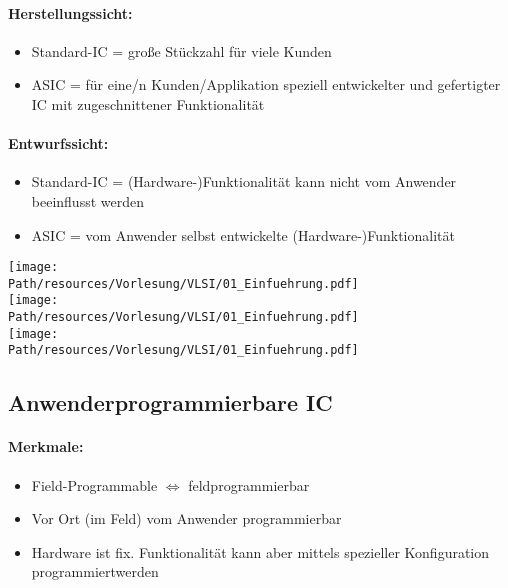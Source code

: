 	\paragraph{Herstellungssicht:}
	\begin{itemize}
		\item Standard-IC = große Stückzahl für viele Kunden
		\item ASIC = für eine/n Kunden/Applikation speziell entwickelter und gefertigter IC mit zugeschnittener Funktionalität
	\end{itemize}

	\paragraph{Entwurfssicht:}
	\begin{itemize}
		\item Standard-IC = (Hardware-)Funktionalität kann nicht vom Anwender beeinflusst werden
		\item ASIC = vom Anwender selbst entwickelte (Hardware-)Funktionalität
	\end{itemize}

	\newpage
	\begin{center}
	\texttt{[image: \\Path/resources/Vorlesung/VLSI/01\_Einfuehrung.pdf]}
	\\\texttt{[image: \\Path/resources/Vorlesung/VLSI/01\_Einfuehrung.pdf]}
	\\\texttt{[image: \\Path/resources/Vorlesung/VLSI/01\_Einfuehrung.pdf]}
	\end{center}

\subsection{Anwenderprogrammierbare IC}
	\paragraph{Merkmale:}
	\begin{itemize}
		\item Field-Programmable $\Leftrightarrow$ feldprogrammierbar
		\item Vor Ort (im Feld) vom Anwender programmierbar
		\item Hardware ist fix. Funktionalität kann aber mittels spezieller Konfiguration \grqq programmiert\grqq werden
	\end{itemize}
